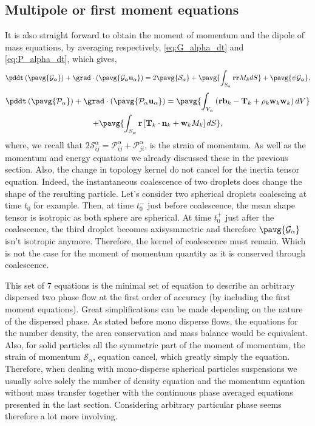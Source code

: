 \subsection{Multipole or first moment equations}

It is also straight forward to obtain the moment of momentum and the dipole of mass equations, by averaging respectively, \ref{eq:G_alpha_dt} and \ref{eq:P_alpha_dt}, which gives, 
\begin{equation}
    \pddt   \left(\pavg{\mathcal{G}_\alpha}\right)
    + \grad \cdot \left(\pavg{\mathcal{G}_\alpha \textbf{u}_\alpha}\right) 
    = 2 \pavg{\mathcal{S}_\alpha}
    + \pavg{\int_{S_\alpha} \textbf{rr} M_k dS}
    +\pavg{\psi \mathcal{G}_\alpha},
    \label{eq:avg_p_G_alpha}
\end{equation}
\begin{multline}
    \pddt   \left(\pavg{\mathcal{P}_\alpha}\right)
    + \grad \cdot \left(\pavg{\mathcal{P}_\alpha \textbf{u}_\alpha}\right) 
    = \pavg{\int_{V_\alpha} \left( 
        \textbf{r} \textbf{b}_k 
        - \textbf{T}_k
        + \rho_k \textbf{w}_k  \textbf{w}_k 
    \right) dV}\\
    + \pavg{
    \int_{S_\alpha} \textbf{r} \left[
        \textbf{T}_k \cdot \textbf{n}_k
        + \textbf{w}_k M_k
    \right] dS},
    \label{eq:avg_p_P_alpha}
\end{multline}
where, we recall that $2\mathcal{S}^\alpha_{ij} = \mathcal{P}^\alpha_{ij} + \mathcal{P}^\alpha_{ji}$, is the strain of momentum. 
As well as the momentum and energy equations we already discussed these in the previous section.
Also, the change in topology kernel do not cancel for the inertia tensor equation. Indeed, the instantaneous coalescence of two droplets does change the shape of the resulting particle.  
Let's consider two spherical droplets coalescing at time $t_0$ for example.
Then, at time $t_0^-$ just before coalescence, the mean shape tensor is isotropic as both sphere are spherical.
At time $t_0^+$ just after the coalescence, the third droplet becomes axisysmmetric and therefore $\pavg{\mathcal{G}_\alpha}$ isn't isotropic anymore. 
Therefore, the kernel of coalescence must remain.  
Which is not the case for the moment of momentum quantity as it is conserved through coalescence. 

This set of 7 equations is the minimal set of equation to describe an arbitrary dispersed two phase flow at the first order of accuracy (by including the first moment equations).
Great simplifications can be made depending on the nature of the dispersed phase.
As stated before mono disperse flows, the equations for the number density, the area conservation and mass balance would be equivalent.
Also, for solid particles all the symmetric part of the moment of momentum, the strain of momentum $\mathcal{S}_\alpha$, equation cancel, which greatly simply the equation. 
Therefore, when dealing with mono-disperse spherical particles suspensions we usually solve solely the number of density equation and the momentum equation without mass transfer together with the continuous phase averaged equations presented in the last section. 
Considering arbitrary particular phase seems therefore a lot more involving. 

